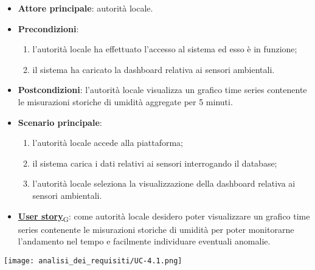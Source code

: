 \begin{itemize}
	\item \textbf{Attore principale}: autorità locale.
	\item \textbf{Precondizioni}:
	      \begin{enumerate}
		      \item l'autorità locale ha effettuato l'accesso al sistema ed esso è in funzione;
		      \item il sistema ha caricato la dashboard relativa ai sensori ambientali.
	      \end{enumerate}
	\item \textbf{Postcondizioni}: l'autorità locale visualizza un grafico time series contenente le misurazioni storiche di umidità aggregate per 5 minuti.
	\item \textbf{Scenario principale}:
	      \begin{enumerate}
		      \item l'autorità locale accede alla piattaforma;
		      \item il sistema carica i dati relativi ai sensori interrogando il database;
		      \item l'autorità locale seleziona la visualizzazione della dashboard relativa ai sensori ambientali.
	      \end{enumerate}
	\item \href{https://7last.github.io/docs/rtb/documentazione-interna/glossario\#user-story}{\textbf{User story}\textsubscript{G}}:
	      come autorità locale desidero poter visualizzare un grafico time series contenente le misurazioni storiche
	      di umidità per poter monitorarne l'andamento nel tempo e facilmente individuare eventuali anomalie.
\end{itemize}
\begin{center}
	\texttt{[image: analisi\_dei\_requisiti/UC-4.1.png]}
\end{center}


